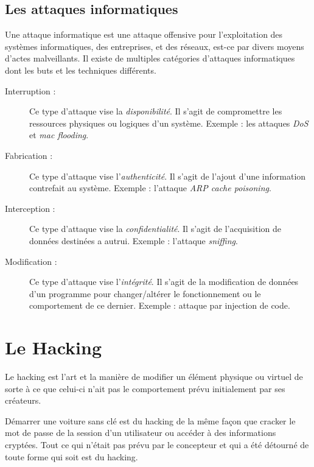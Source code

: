     \subsection{Les attaques informatiques}
    Une attaque informatique est une attaque offensive pour l’exploitation des systèmes informatiques, 
    des entreprises, et des réseaux, est-ce par divers moyens d’actes malveillants. 
    Il existe de multiples catégories d’attaques informatiques dont les buts et les techniques différents.
    \begin{description}
        \item[Interruption :] Ce type d'attaque vise la \emph{disponibilité}. Il s’agit de compromettre les 
            ressources physiques ou logiques d'un système. Exemple : les attaques \emph{DoS} et \emph{mac flooding}.
        \item[Fabrication :] Ce type d’attaque vise l'\emph{authenticité}. Il s'agit de l’ajout d’une 
            information contrefait au système. Exemple : l'attaque \emph{ARP cache poisoning}. %
        \item[Interception :] Ce type d’attaque vise la \emph{confidentialité}. Il s’agit de l'acquisition de données 
            destinées a autrui. Exemple : l’attaque \emph{sniffing}. %
        \item[Modification :] Ce type d’attaque vise l'\emph{intégrité}. Il s’agit de la modification 
            de données d’un programme pour changer/altérer le fonctionnement ou le comportement de ce dernier. 
            Exemple : attaque par injection de code. %
    \end{description}
    
\section{Le Hacking}
    Le hacking \cite{bases_hacking} est l'art et la manière de modifier un élément physique ou virtuel 
    de sorte à ce que celui-ci n'ait pas le comportement prévu initialement par ses créateurs. 

    Démarrer une voiture sans clé est du hacking de la même façon que cracker le mot de passe de la session 
    d'un utilisateur ou accéder à des informations cryptées. Tout ce qui n'était pas prévu par le concepteur et 
    qui a été détourné de toute forme qui soit est du hacking. 

